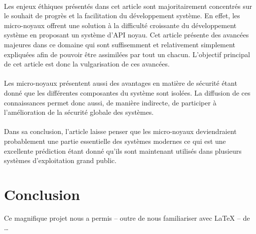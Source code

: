 \documentclass[a4paper, 12pt]{article}
\begin{document}
\paragraph{}
Les enjeux éthiques présentés dans cet article sont majoritairement concentrés sur le souhait de progrès et la facilitation du développement système. En effet, les micro-noyaux offrent une solution à la difficulté croissante du développement système en proposant un système d'API noyau. Cet article présente des avancées majeures dans ce domaine qui sont suffisemment et relativement simplement expliquées afin de pouvoir être assimilées par tout un chacun. L'objectif principal de cet article est donc la vulgarisation de ces avancées. \paragraph{}
Les micro-noyaux présentent aussi des avantages en matière de sécurité étant donné que les différentes composantes du système sont isolées. La diffusion de ces connaissances permet donc aussi, de manière indirecte, de participer à l'amélioration de la sécurité globale des systèmes.
\paragraph{}
Dans sa conclusion, l'article laisse penser que les micro-noyaux deviendraient probablement une partie essentielle des systèmes modernes ce qui est une excellente prédiction étant donné qu'ils sont maintenant utilisés dans plusieurs systèmes d'exploitation grand public.

\clearpage 
\section*{Conclusion}

Ce magnifique projet nous a permis -- outre de nous familiariser avec \LaTeX{} -- de \ldots

\clearpage 




\clearpage 
\appendix
\end{document}
